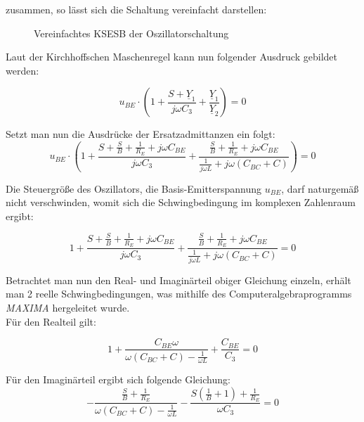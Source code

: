 zusammen, so lässt sich die Schaltung vereinfacht darstellen:

\begin{figure}[H]
	\centering
	\def\svgwidth{0.6\textwidth}
	
	\caption{Vereinfachtes KSESB der Oszillatorschaltung} 
	\label{fig:01_QStatAufbau} 
\end{figure}

Laut der Kirchhoffschen Maschenregel kann nun folgender Ausdruck gebildet werden:

\begin{equation}
    u_{BE} \cdot \left( 1 + \frac{S + \underline{Y}_1}{j \omega C_3} + \frac{\underline{Y}_1}{\underline{Y}_2} \right) = 0
\end{equation}

Setzt man nun die Ausdrücke der Ersatzadmittanzen ein folgt:
\begin{equation}
    u_{BE} \cdot \left( 1 + \frac{S + \frac{S}{B}+\frac{1}{R_E}+j  \omega C_{BE}}{j \omega C_3} + \frac{\frac{S}{B}+\frac{1}{R_E}+j  \omega C_{BE}}{\frac{1}{j\omega L}+j \omega \left( C_{BC} + C \right)} \right) = 0
\end{equation}

Die Steuergröße des Oszillators, die Basis-Emitterspannung $u_{BE}$, darf naturgemäß nicht verschwinden, womit sich die Schwingbedingung im komplexen Zahlenraum ergibt:

\begin{equation}
    1 + \frac{S + \frac{S}{B}+\frac{1}{R_E}+j  \omega C_{BE}}{j \omega C_3} + \frac{\frac{S}{B}+\frac{1}{R_E}+j  \omega C_{BE}}{\frac{1}{j\omega L}+j \omega \left( C_{BC} + C \right)} = 0
\end{equation}

Betrachtet man nun den Real- und Imaginärteil obiger Gleichung einzeln, erhält man 2 reelle Schwingbedingungen, was mithilfe des Computeralgebraprogramms \textit{MAXIMA} hergeleitet wurde.\\
Für den Realteil gilt:

\begin{equation}
\label{glng_01}
    1 + \frac{C_{BE}\omega}{\omega (C_{BC} + C) - \frac{1}{\omega L}} + \frac{C_{BE}}{C_3} = 0
\end{equation}

Für den Imaginärteil ergibt sich folgende Gleichung:
\begin{equation}
    \label{glng_03}
    -\frac{\frac{S}{B}+\frac{1}{R_E}}{\omega(C_{BC} + C)-\frac{1}{\omega L}} - \frac{S\left(\frac{1}{B} + 1\right) + \frac{1}{R_E}}{\omega C_3} = 0
\end{equation}

